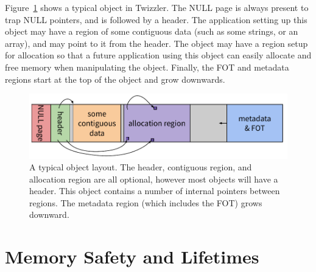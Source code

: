 {    Figure~\ref{fig:typobj} shows a typical object in Twizzler. The NULL page is always present to trap
    NULL pointers, and is followed by a header. The application setting up this object may have a region
    of some contiguous data (such as some strings, or an array), and may point to it from the header.
    The object may have a region setup for allocation so that a future application using this
    object can easily allocate and free memory when manipulating the object. Finally, the FOT and
    metadata regions start at the top of the object and grow downwards.
    \begin{figure}
        \centering
        \includegraphics[width=\linewidth]{fig/typobj}
        \caption{A typical object layout. The header, contiguous region, and allocation region are all
            optional, however most objects will have a header. This object contains a number of internal
            pointers between regions. The metadata region (which includes the FOT) grows downward.}
        \label{fig:typobj}
    \end{figure}
}

\section{Memory Safety and Lifetimes}


